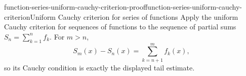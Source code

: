 \documentclass[preview]{standalone}
\begin{document}
\begin{snippetproof}{function-series-uniform-cauchy-criterion-proof}{function-series-uniform-cauchy-criterion}{Uniform Cauchy criterion for series of functions}
    Apply the uniform Cauchy criterion for sequences of functions to the
    sequence of partial sums \(S_n=\sum_{k=1}^{n}f_k\). For \(m>n\),
    \[
        S_m(x)-S_n(x)=\sum_{k=n+1}^{m}f_k(x),
    \]
    so its Cauchy condition is exactly the displayed tail estimate.
\end{snippetproof}
\end{document}
